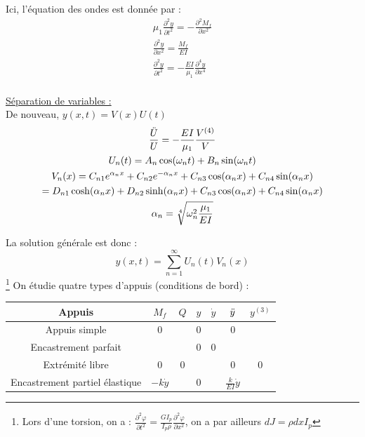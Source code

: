 \documentclass[../main.tex]{subfiles}
\begin{document}
Ici, l'équation des ondes est donnée par : \begin{equation}
    \begin{gathered}
        \mu_1 \frac{\partial^2y}{\partial t^2} = -\frac{\partial^2 M_f}{\partial x^2}\\
        \frac{\partial^2y}{\partial x^2} = \frac{M_f}{EI}\\
        \frac{\partial^2y}{\partial t^2} = - \frac{EI}{\mu_1} \frac{\partial^4 y}{\partial x^4}\\
    \end{gathered}
\end{equation}

\quad \underline{Séparation de variables :}\\
De nouveau, $y(x,t) = V(x)U(t)$\\
\begin{equation} \begin{gathered}
    \frac{\Ddot{U}}{U} = -\frac{EI}{\mu_1} \frac{V^{(4)}}{V}\\
    U_n(t) = A_n \cos(\omega_n t) + B_n \sin(\omega_n t)\\
    V_n(x) = C_{n1} e^{\alpha_nx} + C_{n2} e^{-\alpha_n x} + C_{n3} \cos(\alpha_n x) + C_{n4} \sin(\alpha_n x) \\= D_{n1} \cosh(\alpha_nx) + D_{n2} \sinh(\alpha_n x) + C_{n3} \cos(\alpha_n x) + C_{n4} \sin(\alpha_n x)\\
    \alpha_n = \sqrt[4]{\omega_n^2 \frac{\mu_1}{EI}}\\
    \end{gathered}
\end{equation}

La solution générale est donc : \begin{equation}
        y(x,t) = \sum_{n=1}^\infty U_n(t) V_n(x)
\end{equation}
\footnote{Lors d'une torsion, on a : $\frac{\partial^2 \varphi}{\partial t^2} = \frac{G I_p}{I_p \rho} \frac{\partial^2 \varphi}{\partial x^2}$, on a par ailleurs $dJ = \rho dx I_p$}
On étudie quatre types d'appuis (conditions de bord) : \begin{table}[hbt!]
    \centering
    \begin{tabular}{c|c|c|c|c|c|c}
        Appuis & $M_f$ & $Q$ & $y$ & $\dot{y}$ & $\Ddot{y}$ & $y^{(3)}$ \\
        \hline
        Appuis simple & $0$ & & 0 & & 0 & \\
        \hline
        Encastrement parfait & & & 0 & 0& \\ \hline
        Extrémité libre & 0 & 0 & & & 0& 0\\ \hline
        Encastrement partiel élastique & $-k\dot{y}$ & & 0 & & $\frac{k}{EI} \dot{y}$ & \\
    \end{tabular}
\end{table}
\end{document}
